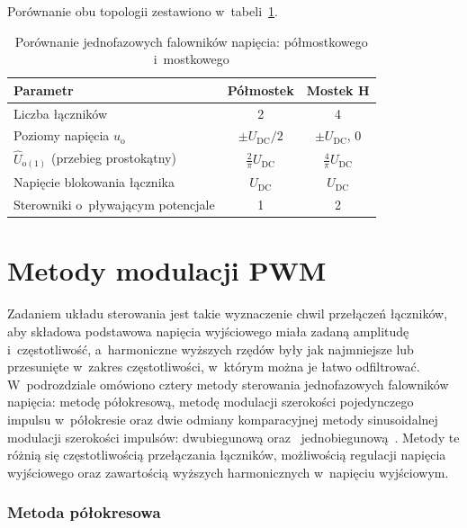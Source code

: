 Porównanie obu topologii zestawiono w~tabeli~\ref{tab:porownanie-topologii}.

\begin{table}[H]
  \centering
  \caption{Porównanie jednofazowych falowników napięcia: półmostkowego i~mostkowego}
  \label{tab:porownanie-topologii}
  \begin{tabular}{lcc}
    \toprule
    Parametr & Półmostek & Mostek H \\
    \midrule
    Liczba łączników & 2 & 4 \\
    Poziomy napięcia $u_\mathrm{o}$ & $\pm U_\mathrm{DC}/2$
      & $\pm U_\mathrm{DC}$, $0$ \\
    $\hat U_{\mathrm{o}(1)}$ (przebieg prostokątny)
      & $\frac{2}{\pi}U_\mathrm{DC}$ & $\frac{4}{\pi}U_\mathrm{DC}$ \\
    Napięcie blokowania łącznika & $U_\mathrm{DC}$ & $U_\mathrm{DC}$ \\
    Sterowniki o~pływającym potencjale & 1 & 2 \\
    \bottomrule
  \end{tabular}
\end{table}

\section{Metody modulacji PWM}
\label{sec: Metody modulacji PWM}

Zadaniem układu sterowania jest takie wyznaczenie chwil przełączeń łączników,
aby składowa podstawowa napięcia wyjściowego miała zadaną amplitudę
i~częstotliwość, a~harmoniczne wyższych rzędów były jak najmniejsze lub
przesunięte w~zakres częstotliwości, w~którym można je łatwo odfiltrować.
W~podrozdziale omówiono cztery metody sterowania jednofazowych falowników
napięcia: metodę półokresową, metodę modulacji szerokości pojedynczego impulsu
w~półokresie oraz dwie odmiany komparacyjnej metody sinusoidalnej modulacji
szerokości impulsów: dwubiegunową oraz ~jednobiegunową~\cite[s.~5--12]{instrukcja}.
Metody te różnią się częstotliwością przełączania łączników, możliwością
regulacji napięcia wyjściowego oraz zawartością wyższych harmonicznych
w~napięciu wyjściowym.

\subsubsection*{Metoda półokresowa}

